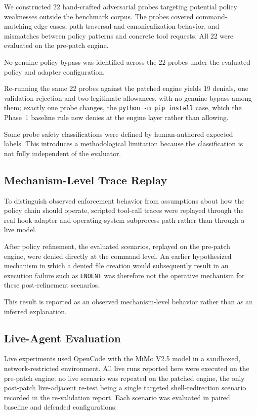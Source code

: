 \documentclass[11pt,a4paper]{article}
\begin{document}
We constructed 22 hand-crafted adversarial probes targeting potential policy
weaknesses outside the benchmark corpus. The probes covered command-matching
edge cases, path traversal and canonicalization behavior, and mismatches
between policy patterns and concrete tool requests. All 22 were evaluated on
the pre-patch engine.

No genuine policy bypass was identified across the 22 probes under the
evaluated policy and adapter configuration.

Re-running the same 22 probes against the patched engine yields 19 denials,
one validation rejection and two legitimate allowances, with no genuine
bypass among them; exactly one probe changes, the
\texttt{python -m pip install} case, which the Phase~1 baseline rule now
denies at the engine layer rather than allowing.

Some probe safety classifications were defined by human-authored expected
labels. This introduces a methodological limitation because the
classification is not fully independent of the evaluator.

\subsection{Mechanism-Level Trace Replay}

To distinguish observed enforcement behavior from assumptions about how the
policy chain should operate, scripted tool-call traces were replayed through
the real hook adapter and operating-system subprocess path rather than
through a live model.

After policy refinement, the evaluated scenarios, replayed on the pre-patch
engine, were denied directly at the command level. An earlier hypothesized mechanism in which a denied file
creation would subsequently result in an execution failure such as
\texttt{ENOENT} was therefore not the operative mechanism for these
post-refinement scenarios.

This result is reported as an observed mechanism-level behavior rather than
as an inferred explanation.

\subsection{Live-Agent Evaluation}

Live experiments used OpenCode with the MiMo V2.5 model in a sandboxed,
network-restricted environment. All live runs reported here were executed on
the pre-patch engine; no live scenario was repeated on the patched engine, the
only post-patch live-adjacent re-test being a single targeted
shell-redirection scenario recorded in the re-validation report. Each scenario
was evaluated in paired baseline and defended configurations:
\end{document}
